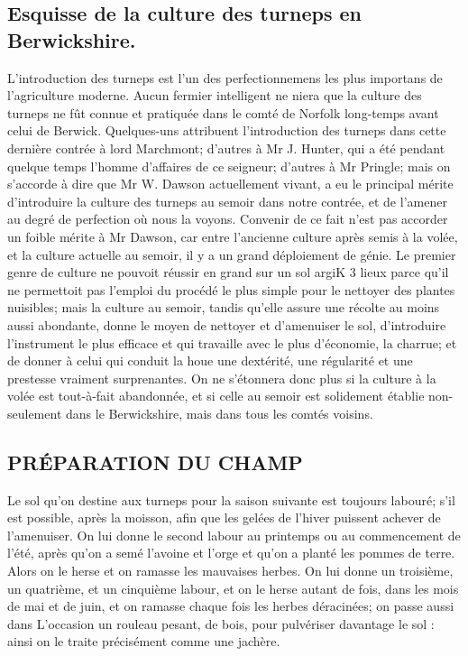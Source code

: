 \subsection{Esquisse de la culture des turneps en Berwickshire.}
L'introduction des turneps est l'un des perfectionnemens les plus importans de l'agriculture moderne. Aucun fermier intelligent ne niera que la culture des turneps ne fût connue et pratiquée dans le comté de Norfolk long-temps avant celui de Berwick. Quelques-uns attribuent l'introduction des turneps dans cette dernière contrée à lord Marchmont; d'autres à Mr J. Hunter, qui a été pendant quelque temps l'homme d'affaires de ce seigneur; d'autres à Mr Pringle; mais on s'accorde à dire que Mr W. Dawson actuellement vivant, a eu le principal mérite d'introduire la culture des turneps au semoir dans notre contrée, et de l'amener au degré de perfection où nous la voyons. Convenir de ce fait n'est pas accorder un foible mérite à Mr Dawson, car entre l'ancienne culture après semis à la volée, et la culture actuelle au semoir, il y a un grand déploiement de génie. Le premier genre de culture ne pouvoit réussir en grand sur un sol argiK 3\setcounter{page}{114} lieux parce qu'il ne permettoit pas l'emploi du procédé le plus simple pour le nettoyer des plantes nuisibles; mais la culture au semoir, tandis qu'elle assure une récolte au moins aussi abondante, donne le moyen de nettoyer et d'amenuiser le sol, d'introduire l'instrument le plus efficace et qui travaille avec le plus d'économie, la charrue; et de donner à celui qui conduit la houe une dextérité, une régularité et une prestesse vraiment surprenantes. On ne s'étonnera donc plus si la culture à la volée est tout-à-fait abandonnée, et si celle au semoir est solidement établie non-seulement dans le Berwickshire, mais dans tous les comtés voisins.
\subsection{PRÉPARATION DU CHAMP}
Le sol qu'on destine aux turneps pour la saison suivante est toujours labouré; s'il est possible, après la moisson, afin que les gelées de l'hiver puissent achever de l'amenuiser. On lui donne le second labour au printemps ou au commencement de l'été, après qu'on a semé l'avoine et l'orge et qu'on a planté les pommes de terre. Alors on le herse et on ramasse les mauvaises herbes. On lui donne un troisième, un quatrième, et un cinquième labour, et on le herse autant de fois, dans les mois de mai et de juin, et on ramasse chaque fois les herbes déracinées; on passe aussi dans\setcounter{page}{115} L'occasion un rouleau pesant, de bois, pour pulvériser davantage le sol : ainsi on le traite précisément comme une jachère.
